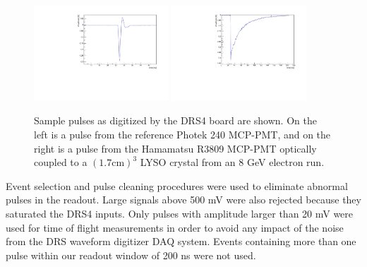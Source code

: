 \documentclass[12pt]{article}
\begin{document}
\begin{figure}[h] \centering
\includegraphics[width=0.45\textwidth]{figs/RefPulse} 
\includegraphics[width=0.45\textwidth]{figs/ScintPulse} 
\caption{Sample pulses as digitized by the DRS4 board are shown. 
On the left is a  pulse from the reference Photek 240 MCP-PMT, 
and on the right is a pulse from the Hamamatsu R3809 MCP-PMT
optically coupled to a $(1.7\mathrm{ cm})^3$ LYSO crystal 
from an 8 GeV electron run.} 
\label{fig:PulseShapes}
\end{figure}

Event selection and pulse cleaning procedures were used to eliminate abnormal
pulses in the readout. Large signals above 500 mV were also rejected because
they saturated the DRS4 inputs. Only pulses with amplitude 
larger than 20 mV were used for time of flight measurements in order to 
avoid any impact of the noise from the DRS waveform digitizer DAQ system. 
Events containing more than one pulse within our readout window of 200 ns 
were not used. 
\end{document}
